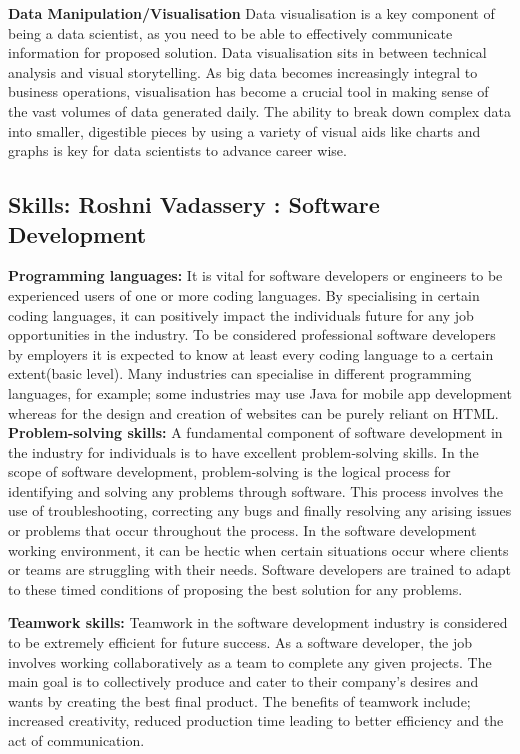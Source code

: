 \documentclass[a4paper, 11pt]{report}
\begin{document}
\textbf{Data Manipulation/Visualisation}
Data visualisation is a key component of being a data scientist, as you need to be able to effectively communicate information for proposed solution.  Data visualisation sits in between technical analysis and visual storytelling. As big data becomes increasingly integral to business operations, visualisation has become a crucial tool in making sense of the vast volumes of data generated daily. The ability to break down complex data into smaller, digestible pieces by using a variety of visual aids like charts and graphs is key for data scientists to advance career wise.



\subsection{Skills: Roshni Vadassery : Software Development}

\textbf{Programming languages:} 
It is vital for software developers or engineers to be experienced users of one or more coding languages. By specialising in certain coding languages, it can positively impact the individuals future for any job opportunities in the industry. To be considered professional software developers by employers it is expected to know at least every coding language to a certain extent(basic level). Many industries can specialise in different programming languages, for example; some industries may use Java for mobile app development whereas for the design and creation of websites can be purely reliant on HTML.          
\textbf{Problem-solving skills:} 
A fundamental component of software development in the industry for individuals is to have excellent problem-solving skills. In the scope of software development, problem-solving is the logical process for identifying and solving any problems through software. This process involves the use of troubleshooting, correcting any bugs and finally resolving any arising issues or problems that occur throughout the process. In the software development working environment, it can be hectic when certain situations occur where clients or teams are struggling with their needs. Software developers are trained to adapt to these timed conditions of proposing the best solution for any problems.  

\textbf{Teamwork skills:} 
Teamwork in the software development industry is considered to be extremely efficient for future success. As a software developer, the job involves working collaboratively as a team to complete any given projects. The main goal is to collectively produce and cater to their company's desires and wants by creating the best final product. The benefits of teamwork include; increased creativity, reduced production time leading to better efficiency and the act of communication.     
\end{document}
